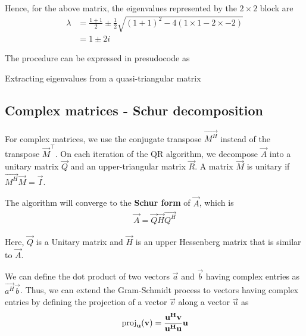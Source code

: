 \documentclass{article}
\begin{document}
Hence, for the above matrix, the eigenvalues represented by the $2 \times 2$ block are
\begin{align}
    \lambda &= \frac{1 + 1}{2} \pm \frac{1}{2}\sqrt{(1 + 1)^2 - 4(1\times1 - 2\times-2)} \\
    &= 1 \pm 2i
\end{align}

The procedure can be expressed in presudocode as

\begin{algorithm}
    \caption{Extracting eigenvalues from a quasi-triangular matrix}
\end{algorithm}

\subsection{Complex matrices - Schur decomposition}

For complex matrices, we use the conjugate transpose $\vec{M^H}$
instead of the transpose $\vec{M}^\top$. On each iteration of the 
QR algorithm, we decompose $\vec{A}$ into a unitary matrix $\vec{Q}$
and an upper-triangular matrix $\vec{R}$. A matrix $\vec{M}$ is
unitary if $\vec{M^H}\vec{M} = \vec{I}$.  

The algorithm will converge to the \textbf{Schur form} of $\vec{A}$,
which is
\begin{align}
    \vec{A} = \vec{Q}\vec{H}\vec{Q^H}
\end{align}

Here, $\vec{Q}$ is a Unitary matrix and $\vec{H}$ is an upper Hessenberg
matrix that is similar to $\vec{A}$.

We can define the dot product of two vectors $\vec{a}$ and $\vec{b}$
having complex entries as $\vec{a^H}\vec{b}$. Thus, we can extend the
Gram-Schmidt process to vectors having complex entries by defining
the projection of a vector $\vec{v}$ along a vector $\vec{u}$ as
\begin{align}
    \operatorname{proj}_{\mathbf{u}}(\mathbf{v}) = \frac{\mathbf{u^H}\mathbf{v}}{\mathbf{u^H}\mathbf{u}} \mathbf{u}
\end{align}
\end{document}
